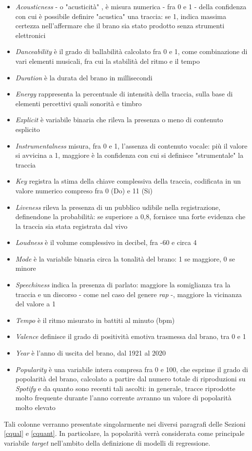 \documentclass[fleqn,10pt]{SelfArx} %
\begin{document}
\begin{itemize}
    \item \textit{Acousticness} - o "acusticità" , è misura numerica - fra 0 e 1 - della confidenza con cui è possibile definire "acustica" una traccia: se 1, indica massima certezza nell'affermare che il brano sia stato prodotto senza strumenti elettronici
    \item \textit{Danceability} è il grado di ballabilità calcolato fra 0 e 1, come combinazione di vari elementi musicali, fra cui la stabilità del ritmo e il tempo
    \item \textit{Duration} è la durata del brano in millisecondi
    \item \textit{Energy} rappresenta la percentuale di intensità della traccia, sulla base di elementi percettivi quali sonorità e timbro
    \item \textit{Explicit} è variabile binaria che rileva la presenza o meno di contenuto esplicito
    \item \textit{Instrumentalness} misura, fra 0 e 1, l'assenza di contenuto vocale: più il valore si avvicina a 1, maggiore è la confidenza con cui si definisce "strumentale" la traccia
    \item \textit{Key} registra la stima della chiave complessiva della traccia, codificata in un valore numerico compreso fra 0 (Do) e 11 (Si)
    \item \textit{Liveness} rileva la presenza di un pubblico udibile nella registrazione, definendone la probabilità: se superiore a 0,8, fornisce una forte evidenza che la traccia sia stata registrata dal vivo
    \item \textit{Loudness} è il volume complessivo in decibel, fra -60 e circa 4
    \item \textit{Mode} è la variabile binaria circa la tonalità del brano: 1 se maggiore, 0 se minore
    \item \textit{Speechiness} indica la presenza di parlato: maggiore la somiglianza tra la traccia e un discorso - come nel caso del genere \textit{rap} -, maggiore la vicinanza del valore a 1
    \item \textit{Tempo} è il ritmo misurato in battiti al minuto (bpm)
    \item \textit{Valence} definisce il grado di positività emotiva trasmessa dal brano, tra 0 e 1
    \item \textit{Year} è l'anno di uscita del brano, dal 1921 al 2020
    \item \textit{Popularity} è una variabile intera compresa fra 0 e 100, che esprime il grado di popolarità del brano, calcolato a partire dal numero totale di riproduzioni su \textit{Spotify} e da quanto sono recenti tali ascolti: in generale, tracce riprodotte molto frequente durante l'anno corrente avranno un valore di popolarità molto elevato
\end{itemize}
Tali colonne verranno presentate singolarmente nei diversi paragrafi delle Sezioni \ref{cqual} e \ref{cquant}. In particolare, la popolarità verrà considerata come principale variabile \textit{target} nell'ambito della definizione di modelli di regressione.\\
\end{document}
